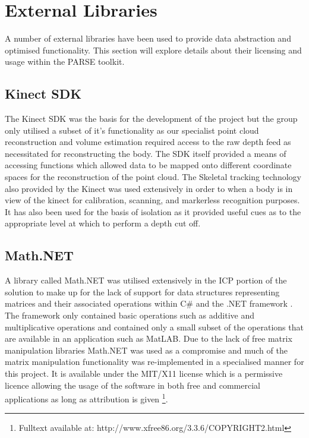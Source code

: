 \section{External Libraries}
A number of external libraries have been used to provide data abstraction and optimised functionality. This section will explore details about their licensing and usage within the PARSE toolkit. \\

\subsection{Kinect SDK}
The Kinect SDK was the basis for the development of the project but the group only utilised a subset of it's functionality as our specialist point cloud reconstruction and volume estimation required access to the raw depth feed as necessitated for reconstructing the body. The SDK itself provided a means of accessing functions which allowed data to be mapped onto different coordinate spaces for the reconstruction of the point cloud. The Skeletal tracking technology also provided by the Kinect was used extensively in order to when a body is in view of the kinect for calibration, scanning, and markerless recognition purposes. It has also been used for the basis of isolation as it provided useful cues as to the appropriate level at which to perform a depth cut off. \\ 

\subsection{Math.NET}
A library called Math.NET was utilised extensively in the ICP portion of the solution to make up for the lack of support for data structures representing matrices and their associated operations within C# and the .NET framework \cite{mathdotnet}. The framework only contained basic operations such as additive and multiplicative operations and contained only a small subset of the operations that are available in an application such as MatLAB. Due to the lack of free matrix manipulation libraries Math.NET was used as a compromise and much of the matrix manipulation functionality was re-implemented in a specialised manner for this project. It is available under the MIT/X11 license which is a permissive licence allowing the usage of the software in both free and commercial applications as long as attribution is given \footnote{Fulltext available at: http://www.xfree86.org/3.3.6/COPYRIGHT2.html}. \\

